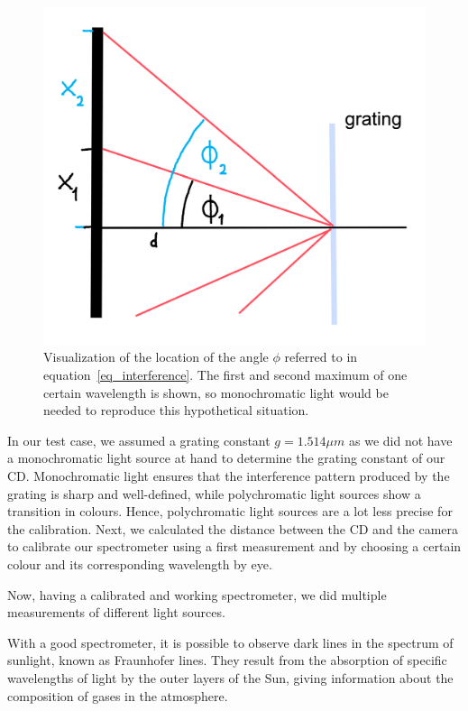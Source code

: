     \begin{figure}[H]
        \centering
        \includegraphics[scale = 0.7]{src/images/angle_phi.png}
        \caption{Visualization of the location of the angle $\phi$ referred to in equation~\eqref{eq_interference}.
        The first and second maximum of one certain wavelength is shown, so monochromatic light would be needed to reproduce this hypothetical situation.}
        \label{fig_phi}
    \end{figure}

    In our test case, we assumed a grating constant $g = 1.514 \mu m$ \cite{src_grating_constant} as we did not have a monochromatic light source at hand to determine the grating constant of our CD.
    Monochromatic light ensures that the interference pattern produced by the grating is sharp and well-defined, while polychromatic light sources show a transition in colours.
    Hence, polychromatic light sources are a lot less precise for the calibration.
    Next, we calculated the distance between the CD and the camera to calibrate our spectrometer using a first measurement and by choosing a certain colour and its corresponding wavelength by eye.

    Now, having a calibrated and working spectrometer, we did multiple measurements of different light sources.

    With a good spectrometer, it is possible to observe dark lines in the spectrum of sunlight, known as Fraunhofer lines.
    They result from the absorption of specific wavelengths of light by the outer layers of the Sun, giving information about the composition of gases in the atmosphere.

